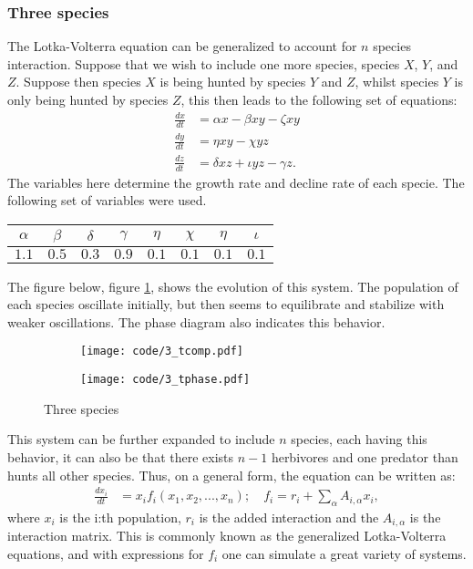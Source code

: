 \documentclass[a4paper]{article}
\begin{document}
\subsubsection{Three species}
The Lotka-Volterra equation can be generalized to account for $n$ species interaction. Suppose that we wish to include one more species, species $X$, $Y$, and $Z$. Suppose then species $X$ is being hunted by species $Y$ and $Z$, whilst species $Y$ is only being hunted by species $Z$, this then leads to the following set of equations:
\begin{align}
    \frac{dx}{dt} &= \alpha x - \beta xy \nonumber - \zeta xy\\
    \frac{dy}{dt} &= \eta x y - \chi y z \nonumber\\
    \frac{dz}{dt} &= \delta xz + \iota yz - \gamma z.\label{eq: mod-eq2}
\end{align}The variables here determine the growth rate and decline rate of each specie. The following set of variables were used.
\begin{table}[H]
    \centering
    \begin{tabular}{|c|c|c|c|c|c|c|c|}\hline
    $\alpha$ & $\beta$ & $\delta$ & $\gamma$ & $\eta$ & $\chi$ & $\eta$ & $\iota$ \\\hline
    $1.1$ & $0.5$ & $0.3$ & $0.9$ & $0.1$ & $0.1$ & $0.1$ & $0.1$\\\hline
    \end{tabular}
\end{table}\noindent
The figure below, figure \ref{fig: 3species t}, shows the evolution of this system. The population of each species oscillate initially, but then seems to equilibrate and stabilize with weaker oscillations. The phase diagram also indicates this behavior.
\begin{figure}[H]
    \centering
    \begin{subfigure}{0.45\textwidth}
        \texttt{[image: code/3\_tcomp.pdf]}
    \end{subfigure}
    \hfill
    \begin{subfigure}{0.45\textwidth}
        \texttt{[image: code/3\_tphase.pdf]}
    \end{subfigure}
    \caption{Three species}
    \label{fig: 3species t}
\end{figure}\noindent
This system can be further expanded to include $n$ species, each having this behavior, it can also be that there exists $n-1$ herbivores and one predator than hunts all other species. Thus, on a general form, the equation can be written as:
\begin{align}
    \frac{dx_i}{dt} &= x_if_i(x_1, x_2, ..., x_n); \quad f_i = r_i + \sum_{\alpha}A_{i, \alpha}x_i,
\end{align}where $x_i$ is the i:th population, $r_i$ is the added interaction and the $A_{i, \alpha}$ is the interaction matrix. This is commonly known as the generalized Lotka-Volterra equations, and with expressions for $f_i$ one can simulate a great variety of systems.
\end{document}
